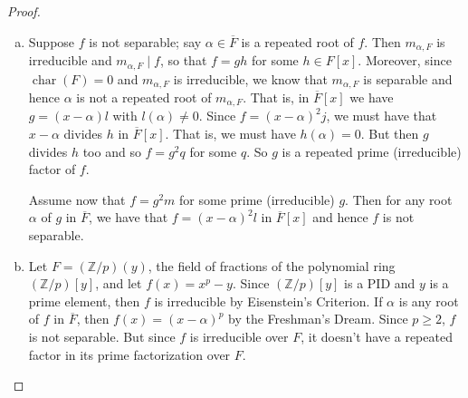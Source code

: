\documentclass[11pt]{article}
\DeclareMathOperator{\ch}{char}
\newcommand{\Z}{\mathbb{Z}}
\newcommand{\ov}[1]{\overline{#1}}
\def\ov#1{\overline{#1}}
\theoremstyle{definition}
\begin{document}
\begin{proof}$\,$
\begin{enumerate}[(a)]
    \item Suppose $f$ is not separable; say $\alpha \in \overline{F}$ is a repeated root of $f$. Then $m_{\alpha, F}$ is irreducible and $m_{\alpha, F} \mid f$, so that $f = g h$ for some $h \in F[x]$. Moreover, since $\ch(F) = 0$ and $m_{\alpha, F}$ is irreducible, we know that $m_{\alpha, F}$ is separable and hence $\alpha$ is not a repeated root of $m_{\alpha, F}$.
      That is, in $\ov{F}[x]$ we have $g= (x - \alpha)l$ with $l(\alpha) \neq 0$. Since $f = (x-\alpha)^2 j$, we must have that $x - \alpha$ divides $h$ in $\overline{F}[x]$.
      That is, we must have $h(\alpha) = 0$. But then $g$ divides $h$ too and so $f = g^2 q$ for some $q$. So $g$ is a repeated prime (irreducible) factor of $f$.

Assume now that $f = g^2 m$ for some prime (irreducible) $g$. Then for any root $\alpha$ of $g$ in $\overline{F}$,
      we have that $f = (x-\alpha)^2l$ in $\overline{F}[x]$ and hence $f$ is not separable. 
    

\item Let $F = (\Z/p)(y)$, the field of fractions of the polynomial ring $(\Z/p)[y]$,
        and let $f(x) = x^p - y$. Since $(\Z/p)[y]$ is a PID and $y$ is a prime element,
        then $f$ is irreducible by Eisenstein's Criterion. 
        If $\alpha$ is any root of $f$ in $\overline{F}$, then $f(x)  = (x-\alpha)^p$ by the Freshman's Dream. Since $p \geqslant 2$, $f$ is not separable. But since $f$ is irreducible over $F$, it doesn't have a repeated factor in its prime factorization over $F$.\qedhere
\end{enumerate}
\end{proof}
\end{document}
